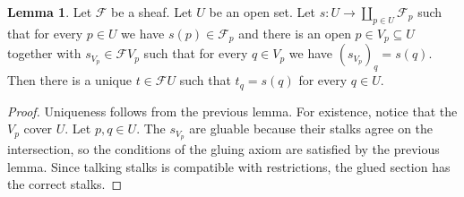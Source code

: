 \documentclass[a4paper]{amsbook}
\theoremstyle{definition}
\newtheorem*{lemma*}{Lemma}
\begin{document}
\begin{lemma*}
\label{Lemma2}
Let $\mathcal{F}$ be a sheaf. Let $U$ be an open set.
Let $s\colon U\to\coprod_{p \in U} \mathcal{F}_p$ such that
for every $p \in U$ we have $s(p) \in \mathcal{F}_p$ and there is an open
$p \in V_p \subseteq U$ together with $s_{V_p} \in \mathcal{F}V_p$ such that
for every $q \in V_p$ we have $(s_{V_p})_q = s(q)$. Then there is a unique
$t \in \mathcal{F}U$ such that $t_q = s(q)$ for every $q \in U$.
\end{lemma*}
\begin{proof}[Proof]
Uniqueness follows from the previous lemma. For existence, notice that the
$V_p$ cover $U$. Let $p, q \in U$. The $s_{V_p}$ are gluable because their stalks
agree on the intersection, so the conditions of the gluing axiom are satisfied
by the previous lemma. Since talking stalks is compatible with restrictions, the
glued section has the correct stalks.
\end{proof}
\end{document}
